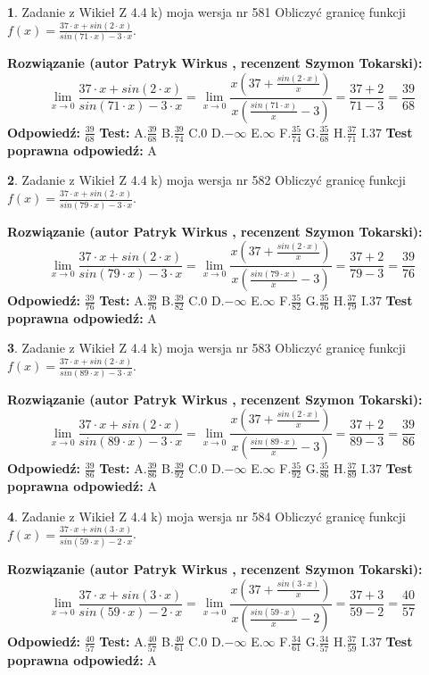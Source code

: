 \documentclass[12pt, a4paper]{article}
\theoremstyle{definition} %
\newtheorem{zad}{}
\newcommand{\zadStart}[1]{\begin{zad}#1\newline}
\newcommand{\zadStop}{\end{zad}}
\newcommand{\rozwStart}[2]{\noindent \textbf{Rozwiązanie (autor #1 , recenzent #2): }\newline}
\newcommand{\rozwStop}{\newline}
\newcommand{\odpStart}{\noindent \textbf{Odpowiedź:}\newline}
\newcommand{\odpStop}{\newline}
\newcommand{\testStart}{\noindent \textbf{Test:}\newline}
\newcommand{\testStop}{\newline}
\newcommand{\kluczStart}{\noindent \textbf{Test poprawna odpowiedź:}\newline}
\newcommand{\kluczStop}{\newline}
\begin{document}
\zadStart{Zadanie z Wikieł Z 4.4 k) moja wersja nr 581}
Obliczyć granicę funkcji $f(x)=\frac{37\cdot x +sin(2\cdot x)}{sin(71\cdot x) -3\cdot x}$.
\zadStop
\rozwStart{Patryk Wirkus}{Szymon Tokarski}
$$\lim\limits_{x\to 0}\frac{37\cdot x +sin(2\cdot x)}{sin(71\cdot x) -3\cdot x}
=\lim\limits_{x\to 0}\frac{x(37+\frac{sin(2\cdot x)}{x})}{x(\frac{sin(71\cdot x)}{x}-3)}
=\frac{37+2}{71-3} = \frac{39}{68}$$
\rozwStop
\odpStart
$\frac{39}{68}$
\odpStop
\testStart
A.$\frac{39}{68}$
B.$\frac{39}{74}$
C.$0$
D.$-\infty$
E.$\infty$
F.$\frac{35}{74}$
G.$\frac{35}{68}$
H.$\frac{37}{71}$
I.$37$
\testStop
\kluczStart
A
\kluczStop



\zadStart{Zadanie z Wikieł Z 4.4 k) moja wersja nr 582}
Obliczyć granicę funkcji $f(x)=\frac{37\cdot x +sin(2\cdot x)}{sin(79\cdot x) -3\cdot x}$.
\zadStop
\rozwStart{Patryk Wirkus}{Szymon Tokarski}
$$\lim\limits_{x\to 0}\frac{37\cdot x +sin(2\cdot x)}{sin(79\cdot x) -3\cdot x}
=\lim\limits_{x\to 0}\frac{x(37+\frac{sin(2\cdot x)}{x})}{x(\frac{sin(79\cdot x)}{x}-3)}
=\frac{37+2}{79-3} = \frac{39}{76}$$
\rozwStop
\odpStart
$\frac{39}{76}$
\odpStop
\testStart
A.$\frac{39}{76}$
B.$\frac{39}{82}$
C.$0$
D.$-\infty$
E.$\infty$
F.$\frac{35}{82}$
G.$\frac{35}{76}$
H.$\frac{37}{79}$
I.$37$
\testStop
\kluczStart
A
\kluczStop



\zadStart{Zadanie z Wikieł Z 4.4 k) moja wersja nr 583}
Obliczyć granicę funkcji $f(x)=\frac{37\cdot x +sin(2\cdot x)}{sin(89\cdot x) -3\cdot x}$.
\zadStop
\rozwStart{Patryk Wirkus}{Szymon Tokarski}
$$\lim\limits_{x\to 0}\frac{37\cdot x +sin(2\cdot x)}{sin(89\cdot x) -3\cdot x}
=\lim\limits_{x\to 0}\frac{x(37+\frac{sin(2\cdot x)}{x})}{x(\frac{sin(89\cdot x)}{x}-3)}
=\frac{37+2}{89-3} = \frac{39}{86}$$
\rozwStop
\odpStart
$\frac{39}{86}$
\odpStop
\testStart
A.$\frac{39}{86}$
B.$\frac{39}{92}$
C.$0$
D.$-\infty$
E.$\infty$
F.$\frac{35}{92}$
G.$\frac{35}{86}$
H.$\frac{37}{89}$
I.$37$
\testStop
\kluczStart
A
\kluczStop



\zadStart{Zadanie z Wikieł Z 4.4 k) moja wersja nr 584}
Obliczyć granicę funkcji $f(x)=\frac{37\cdot x +sin(3\cdot x)}{sin(59\cdot x) -2\cdot x}$.
\zadStop
\rozwStart{Patryk Wirkus}{Szymon Tokarski}
$$\lim\limits_{x\to 0}\frac{37\cdot x +sin(3\cdot x)}{sin(59\cdot x) -2\cdot x}
=\lim\limits_{x\to 0}\frac{x(37+\frac{sin(3\cdot x)}{x})}{x(\frac{sin(59\cdot x)}{x}-2)}
=\frac{37+3}{59-2} = \frac{40}{57}$$
\rozwStop
\odpStart
$\frac{40}{57}$
\odpStop
\testStart
A.$\frac{40}{57}$
B.$\frac{40}{61}$
C.$0$
D.$-\infty$
E.$\infty$
F.$\frac{34}{61}$
G.$\frac{34}{57}$
H.$\frac{37}{59}$
I.$37$
\testStop
\kluczStart
A
\kluczStop
\end{document}
